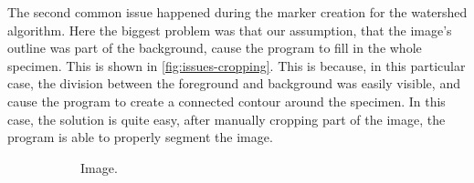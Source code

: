 \documentclass[
  digital,     %
  oneside,     %
  nosansbold,  %
  nocolorbold, %
  lof,         %
  lot,         %
]{fithesis4}
\begin{document}
The second common issue happened during the marker creation for the watershed
algorithm. Here the biggest problem was that our assumption, that the image's
outline was part of the background, cause the program to fill in the whole
specimen. This is shown in \ref{fig:issues-cropping}. This is because, in this
particular case, the division between the foreground and background was easily
visible, and cause the program to create a connected contour around the
specimen. In this case, the solution is quite easy, after manually cropping part
of the image, the program is able to properly segment the image.

\begin{figure}
    \begin{subfigure}[t]{0.3\textwidth}
        \caption{Image.}
    \end{subfigure}
    \begin{subfigure}[t]{0.3\textwidth}

\end{subfigure}
\end{figure}
\end{document}
